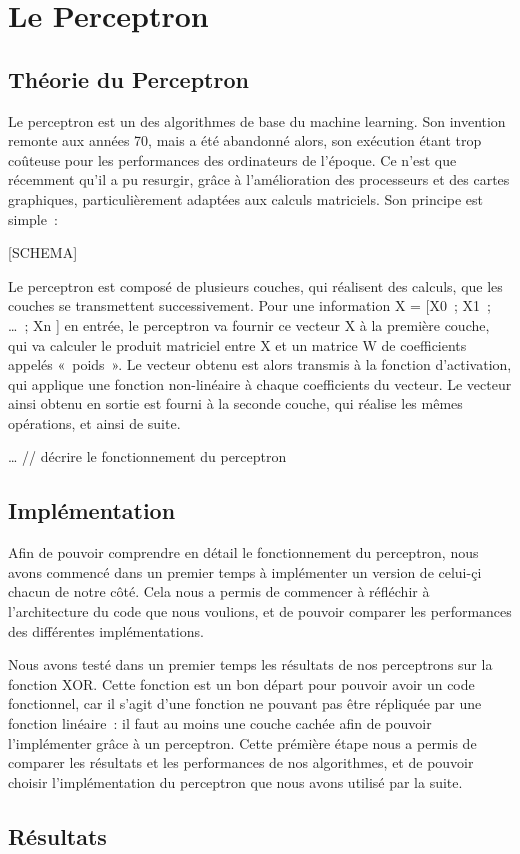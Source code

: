 \section{Le Perceptron}
\fancyhead[R]{\textit{\nouppercase{\leftmark}}}

\subsection{Théorie du Perceptron}

Le perceptron est un des algorithmes de base du machine learning. Son invention remonte aux années 70, mais a été abandonné alors, son exécution étant trop coûteuse pour les performances des ordinateurs de l’époque. Ce n’est que récemment qu’il a pu resurgir, grâce à l’amélioration des processeurs et des cartes graphiques, particulièrement adaptées aux calculs matriciels.
Son principe est simple : 

[SCHEMA]

Le perceptron est composé de plusieurs couches, qui réalisent des calculs, que les couches se transmettent successivement. Pour une information X  = [X0 ; X1 ; … ; Xn ] en entrée, le perceptron va fournir ce vecteur X à la première couche, qui va calculer le produit matriciel entre X et un matrice W de coefficients appelés « poids ». Le vecteur obtenu est alors transmis à la fonction d’activation, qui applique une fonction non-linéaire à chaque coefficients du vecteur. Le vecteur ainsi obtenu en sortie est fourni à la seconde couche, qui réalise les mêmes opérations, et ainsi de suite. 

… // décrire le fonctionnement du perceptron

\newpage
\subsection{Implémentation}

Afin de pouvoir comprendre en détail le fonctionnement du perceptron, nous avons commencé dans un premier temps à implémenter un version de celui-çi chacun de notre côté. Cela nous a permis de commencer  à réfléchir à l’architecture du code que nous voulions, et de pouvoir comparer les performances des différentes implémentations. 

Nous avons testé dans un premier temps les résultats de nos perceptrons sur la fonction XOR. Cette fonction est un bon départ pour pouvoir avoir un code fonctionnel, car il s’agit d’une fonction ne pouvant pas être répliquée par une fonction linéaire : il faut au moins une couche cachée afin de pouvoir l’implémenter grâce à un perceptron. 
Cette prémière étape nous a permis de comparer les résultats et les performances de nos algorithmes, et de pouvoir choisir l’implémentation du perceptron que nous avons utilisé par la suite.

\newpage

\subsection{Résultats}


